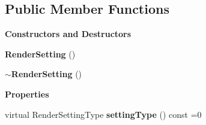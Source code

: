 \subsection*{Public Member Functions}
\begin{Indent}\textbf{ Constructors and Destructors}\par
\begin{DoxyCompactItemize}
\item 
\mbox{\label{classrev_1_1_render_setting_a6c5633939272e38b7e07c03ecb8a4e93}} 
{\bfseries Render\+Setting} ()
\item 
\mbox{\label{classrev_1_1_render_setting_aae6e515bafc7a3bc99695e244da92e5f}} 
{\bfseries $\sim$\+Render\+Setting} ()
\end{DoxyCompactItemize}
\end{Indent}
\begin{Indent}\textbf{ Properties}\par
\begin{DoxyCompactItemize}
\item 
\mbox{\label{classrev_1_1_render_setting_a825be40cc5e75622c77b5fe47907dbc9}} 
virtual Render\+Setting\+Type {\bfseries setting\+Type} () const =0
\end{DoxyCompactItemize}
\end{Indent}
